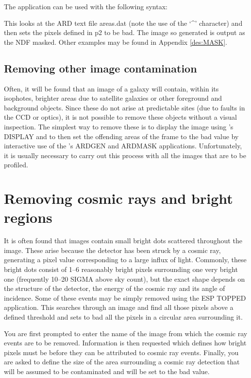 \documentclass[twoside,11pt]{starlink}
\begin{document}
The application can be used with the following syntax:

\begin{terminalv}
\end{terminalv}

This looks at the ARD text file areas.dat (note the use of the
`\^{ }' character) and then sets the pixels defined
in p2 to be bad. The image so generated is output as the NDF masked.
Other examples may be found in Appendix \ref{des:MASK}.


\subsection{Removing other image contamination}

Often, it will be found that an image of a galaxy will contain, within its
isophotes, brighter areas due to satellite galaxies or other foreground and
background objects. Since these do not arise at predictable sites (due to faults
in the CCD or optics), it is not possible to remove
these objects without a visual inspection. The simplest way to remove these
is to display the image using 's DISPLAY and to then set the offending
areas of the frame to the bad value
by interactive use of the 's ARDGEN and ARDMASK applications.
Unfortunately, it is usually necessary to carry out this process with all the
images that are to be profiled.

\section{Removing cosmic rays and bright regions}
\label{sec:removc}

It is often found that images contain small bright dots scattered throughout
the image. These arise because the detector has been struck by a cosmic ray,
generating a pixel value corresponding to a large influx of light. Commonly,
these bright dots consist of 1--6 reasonably bright pixels surrounding one
very bright one (frequently 10--20 SIGMA above sky count), but
the exact shape depends on the structure of the detector, the energy of
the cosmic ray and its angle of incidence. Some of these events may be
simply removed using the ESP TOPPED application. This searches
through an image and find all those pixels above a defined threshold and
sets to bad all the pixels in a circular area surrounding it.

You are first
prompted to enter the name of the image from which the cosmic ray events are
to be removed. Information is then requested which defines how bright pixels
must be before they can be attributed to cosmic ray events. Finally, you are
asked to define
the size of the area surrounding a cosmic ray detection that will be
assumed to be contaminated and will be set to the bad value.
\end{document}
